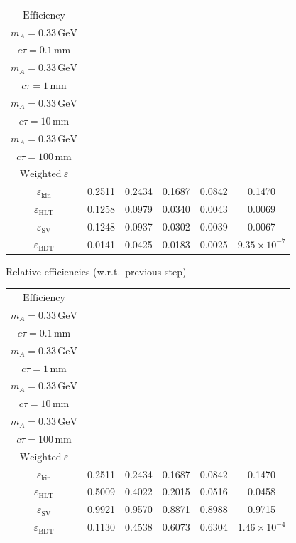 \documentclass[10pt,a4paper]{article}
\begin{document}
{\begin{tabular}{cccccc}
\toprule
$\mathrm{Efficiency}$ & \shortstack{$m_{\pi}=1\,\mathrm{GeV}$\\$m_{A}=0.33\,\mathrm{GeV}$\\$c\tau=0.1\,\mathrm{mm}$} & \shortstack{$m_{\pi}=1\,\mathrm{GeV}$\\$m_{A}=0.33\,\mathrm{GeV}$\\$c\tau=1\,\mathrm{mm}$} & \shortstack{$m_{\pi}=1\,\mathrm{GeV}$\\$m_{A}=0.33\,\mathrm{GeV}$\\$c\tau=10\,\mathrm{mm}$} & \shortstack{$m_{\pi}=1\,\mathrm{GeV}$\\$m_{A}=0.33\,\mathrm{GeV}$\\$c\tau=100\,\mathrm{mm}$} & \shortstack{$\mathrm{QCD}$\\$\mathrm{Weighted}\ \varepsilon$} \\
\midrule
$\varepsilon_{\mathrm{kin}}$ & 0.2511 & 0.2434 & 0.1687 & 0.0842 & 0.1470\\
$\varepsilon_{\mathrm{HLT}}$ & 0.1258 & 0.0979 & 0.0340 & 0.0043 & 0.0069\\
$\varepsilon_{\mathrm{SV}}$ & 0.1248 & 0.0937 & 0.0302 & 0.0039 & 0.0067\\
$\varepsilon_{\mathrm{BDT}}$ & 0.0141 & 0.0425 & 0.0183 & 0.0025 & $9.35\times10^{-7}$\\
\bottomrule
\end{tabular}

\vspace{18pt}

Relative efficiencies (w.r.t.\ previous step)

\begin{tabular}{cccccc}
\toprule
$\mathrm{Efficiency}$ & \shortstack{$m_{\pi}=1\,\mathrm{GeV}$\\$m_{A}=0.33\,\mathrm{GeV}$\\$c\tau=0.1\,\mathrm{mm}$} & \shortstack{$m_{\pi}=1\,\mathrm{GeV}$\\$m_{A}=0.33\,\mathrm{GeV}$\\$c\tau=1\,\mathrm{mm}$} & \shortstack{$m_{\pi}=1\,\mathrm{GeV}$\\$m_{A}=0.33\,\mathrm{GeV}$\\$c\tau=10\,\mathrm{mm}$} & \shortstack{$m_{\pi}=1\,\mathrm{GeV}$\\$m_{A}=0.33\,\mathrm{GeV}$\\$c\tau=100\,\mathrm{mm}$} & \shortstack{$\mathrm{QCD}$\\$\mathrm{Weighted}\ \varepsilon$} \\
\midrule
$\varepsilon_{\mathrm{kin}}$ & 0.2511 & 0.2434 & 0.1687 & 0.0842 & 0.1470\\
$\varepsilon_{\mathrm{HLT}}$ & 0.5009 & 0.4022 & 0.2015 & 0.0516 & 0.0458\\
$\varepsilon_{\mathrm{SV}}$ & 0.9921 & 0.9570 & 0.8871 & 0.8988 & 0.9715\\
$\varepsilon_{\mathrm{BDT}}$ & 0.1130 & 0.4538 & 0.6073 & 0.6304 & $1.46\times10^{-4}$\\
\bottomrule
\end{tabular}

}
\end{document}
